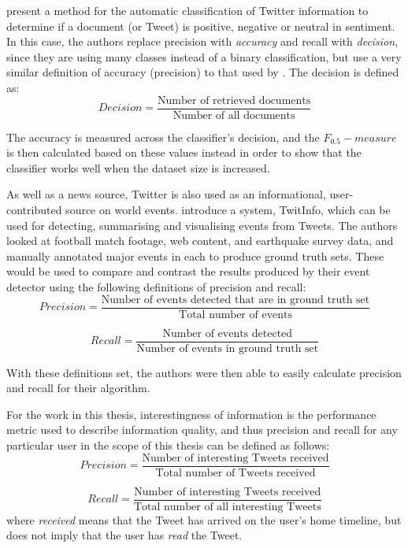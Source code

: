 \citet{pak10} present a method for the automatic classification of Twitter information to determine if a document (or Tweet) is positive, negative or neutral in sentiment. In this case, the authors replace precision with \emph{accuracy} and recall with \emph{decision}, since they are using many classes instead of a binary classification, but use a very similar definition of accuracy (precision) to that used by \citet{castillo11}. The decision is defined as:
%
\[
	Decision = \frac{\text{Number of retrieved documents}}{\text{Number of all documents}}
\]

The accuracy is measured across the classifier's decision, and the $ F_{0.5}-measure $  is then calculated based on these values instead in order to show that the classifier works well when the dataset size is increased.

As well as a news source, Twitter is also used as an informational, user-contributed source on world events. \citet{marcus11} introduce a system, TwitInfo, which can be used for detecting, summarising and visualising events from Tweets. The authors looked at football match footage, web content, and earthquake survey data, and manually annotated major events in each to produce ground truth sets. These would be used to compare and contrast the results produced by their event detector using the following definitions of precision and recall:
\[	
	Precision = \frac{\text{Number of events detected that are in ground truth set}}{\text{Total number of events}}
\]

\[
	Recall = \frac{\text{Number of events detected}}{\text{Number of events in ground truth set}}
\]

With these definitions set, the authors were then able to easily calculate precision and recall for their algorithm.

For the work in this thesis, interestingness of information is the performance metric used to describe information quality, and thus precision and recall for any particular user in the scope of this thesis can be defined as follows:
\[
	Precision = \frac{\text{Number of interesting Tweets received}}{\text{Total number of Tweets received}}
\]

\[
	Recall = \frac{\text{Number of interesting Tweets received}}{\text{Total number of all interesting Tweets}}
\]
where \textit{received} means that the Tweet has arrived on the user's home timeline, but does not imply that the user has \textit{read} the Tweet.

